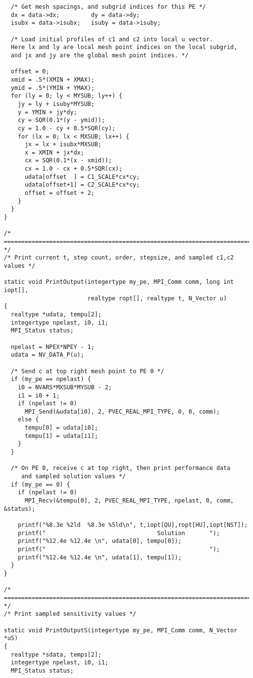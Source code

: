 \begin{verbatim}
  /* Get mesh spacings, and subgrid indices for this PE */
  dx = data->dx;         dy = data->dy;
  isubx = data->isubx;   isuby = data->isuby;

  /* Load initial profiles of c1 and c2 into local u vector.
  Here lx and ly are local mesh point indices on the local subgrid,
  and jx and jy are the global mesh point indices. */

  offset = 0;
  xmid = .5*(XMIN + XMAX);
  ymid = .5*(YMIN + YMAX);
  for (ly = 0; ly < MYSUB; ly++) {
    jy = ly + isuby*MYSUB;
    y = YMIN + jy*dy;
    cy = SQR(0.1*(y - ymid));
    cy = 1.0 - cy + 0.5*SQR(cy);
    for (lx = 0; lx < MXSUB; lx++) {
      jx = lx + isubx*MXSUB;
      x = XMIN + jx*dx;
      cx = SQR(0.1*(x - xmid));
      cx = 1.0 - cx + 0.5*SQR(cx);
      udata[offset  ] = C1_SCALE*cx*cy; 
      udata[offset+1] = C2_SCALE*cx*cy;
      offset = offset + 2;
    }
  }
}

/* ======================================================================= */
/* Print current t, step count, order, stepsize, and sampled c1,c2 values */

static void PrintOutput(integertype my_pe, MPI_Comm comm, long int iopt[], 
                        realtype ropt[], realtype t, N_Vector u)
{
  realtype *udata, tempu[2];
  integertype npelast, i0, i1;
  MPI_Status status;

  npelast = NPEX*NPEY - 1;
  udata = NV_DATA_P(u);

  /* Send c at top right mesh point to PE 0 */
  if (my_pe == npelast) {
    i0 = NVARS*MXSUB*MYSUB - 2;
    i1 = i0 + 1;
    if (npelast != 0)
      MPI_Send(&udata[i0], 2, PVEC_REAL_MPI_TYPE, 0, 0, comm);
    else {
      tempu[0] = udata[i0];
      tempu[1] = udata[i1];
    }
  }

  /* On PE 0, receive c at top right, then print performance data
     and sampled solution values */ 
  if (my_pe == 0) {
    if (npelast != 0)
      MPI_Recv(&tempu[0], 2, PVEC_REAL_MPI_TYPE, npelast, 0, comm, &status);

    printf("%8.3e %2ld  %8.3e %5ld\n", t,iopt[QU],ropt[HU],iopt[NST]);
    printf("                                Solution       ");
    printf("%12.4e %12.4e \n", udata[0], tempu[0]); 
    printf("                                               ");
    printf("%12.4e %12.4e \n", udata[1], tempu[1]);
  }
}

/* ======================================================================= */
/* Print sampled sensitivity values */

static void PrintOutputS(integertype my_pe, MPI_Comm comm, N_Vector *uS)
{
  realtype *sdata, temps[2];
  integertype npelast, i0, i1;
  MPI_Status status;


\end{verbatim}
